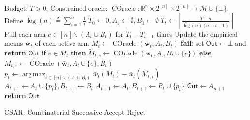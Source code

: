 \documentclass{article}
\newcommand{\AlgorithmBud}{{\small \textsf{CSAR}}\xspace}
\newcommand{\M}{\mathcal M}
\newcommand{\del}{\backslash}
\newcommand{\RR}{\mathbb R}
\DeclareMathOperator*{\argmax}{arg\,max}
\DeclareMathOperator{\COracle}{COracle}
\newcommand{\out}{\mathsf{Out}}
\newcommand{\barlog}{\tilde{\log}}
\renewcommand{\vec}[1]{\boldsymbol{#1}}
\begin{document}
\begin{algorithm}[htbp]
{
\small
\begin{algorithmic}[1]
\Require Budget: $T>0$; Constrained oracle: $\COracle: \RR^n\times 2^{[n]} \times 2^{[n]} \rightarrow \M \cup \{\bot\}$.
\State Define $\barlog(n) \triangleq \sum_{i=1}^n \frac1i$
\State $\tilde T_0 \gets 0, A_1 \gets \emptyset, B_1\gets \emptyset$
	\State $\tilde T_t \gets \left\lceil \frac{T-n}{\barlog(n)(n-t+1)} \right\rceil$
	\State Pull each arm $e\in [n]\del (A_t\cup B_t)$ for $\tilde T_t - \tilde T_{t-1}$ times
	\State Update the empirical means $\vec {\bar w}_t$ of each active arm
	\State $M_t \gets \COracle(\vec {\bar w}_t, A_t, B_t)$
    \State \textbf{fail:} set $\out\gets \bot$ and \textbf{return }$\out$
  \EndIf
	\For{\textbf{each} $e \in [n]\del (A_t\cup B_t)$}
		\State \textbf{if } {$e\in M_t$} \textbf{then }  $\tilde M_{t,e} \gets \COracle(\vec {\bar w}_t, A_t, B_t \cup \{e\})$
		\State \textbf{else} $\tilde M_{t,e} \gets \COracle(\vec {\bar w}_t, A_t \cup \{e\}, B_t)$
	\EndFor
	\State $p_t \gets \argmax_{i\in[n]\del (A_t\cup B_t)} \bar w_t(M_t) - \bar w_t(\tilde M_{t,i})$
		\State $A_{t+1} \gets A_t \cup \{p_t\}, B_{t+1} \gets B_t$
	\Else
		\State $A_{t+1} \gets A_t , B_{t+1} \gets B_t \cup \{p_t\}$
	\EndIf
\EndFor
\State $\out\gets A_{n+1}$
\State \textbf{return} $\out$
\end{algorithmic}
\caption{\AlgorithmBud: Combinatorial Successive Accept Reject}
\label{algo:budget}
}
\end{algorithm}
\vspace{-0.5em}
\end{document}
